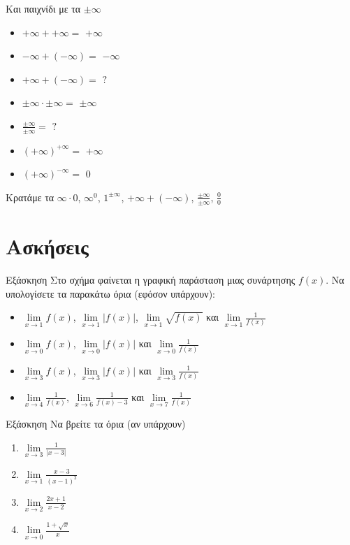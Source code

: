 \documentclass[greek]{beamer}
\begin{document}
\begin{frame}{Και παιχνίδι με τα $\pm\infty$}
 \begin{multicols}{2}
  \begin{itemize}
   \item $+\infty + +\infty=$ \pause $+\infty$ \pause
   \item $-\infty + (-\infty)=$ \pause $-\infty$ \pause
   \item $+\infty + (-\infty)=$ \pause $?$ \pause
   \item $\pm\infty \cdot \pm\infty=$ \pause $\pm\infty$ \pause
   \item $\frac{\pm\infty}{\pm\infty}=$ \pause $?$ \pause
   \item $(+\infty)^{+\infty}=$ \pause $+\infty$ \pause
   \item $(+\infty)^{-\infty}=$ \pause $0$ \pause
  \end{itemize}
 \end{multicols}
 Κρατάμε τα $\infty\cdot 0$, $\infty^0$, $1^{\pm\infty}$, $+\infty + (-\infty)$, $\frac{\pm\infty}{\pm\infty}$, $\frac{0}{0}$
\end{frame}

\section{Ασκήσεις}
\begin{frame}{Εξάσκηση}
 Στο σχήμα
 \href{https://www.geogebra.org/m/xzc6usbm}{}
 φαίνεται η γραφική παράσταση μιας συνάρτησης $f(x)$. Να υπολογίσετε τα παρακάτω όρια (εφόσον υπάρχουν):
 \begin{itemize}
  \item $\lim\limits_{x \to 1}{ f(x) }$, $\lim\limits_{x \to 1}{ |f(x)| }$, $\lim\limits_{x \to 1}{ \sqrt{f(x)} }$ και $\lim\limits_{x \to 1}{ \frac{1}{f(x)} }$ \pause
  \item $\lim\limits_{x \to 0}{ f(x) }$, $\lim\limits_{x \to 0}{ |f(x)| }$ και $\lim\limits_{x \to 0}{ \frac{1}{f(x)} }$ \pause
  \item $\lim\limits_{x \to 3}{ f(x) }$, $\lim\limits_{x \to 3}{ |f(x)| }$ και $\lim\limits_{x \to 3}{ \frac{1}{f(x)} }$ \pause
  \item $\lim\limits_{x \to 4}{ \frac{1}{f(x)} }$, $\lim\limits_{x \to 6}{ \frac{1}{f(x)-3} }$ και $\lim\limits_{x \to 7}{ \frac{1}{f(x)} }$
 \end{itemize}
\end{frame}

\begin{frame}{Εξάσκηση}
 Να βρείτε τα όρια (αν υπάρχουν)
 \begin{enumerate}
  \item $\lim\limits_{x \to 3}{ \frac{1}{|x-3|} }$ \pause
  \item $\lim\limits_{x \to 1}{ \frac{x-3}{(x-1)^2} }$ \pause
  \item $\lim\limits_{x \to 2}{ \frac{2x+1}{x-2} }$ \pause
  \item $\lim\limits_{x \to 0}{ \frac{1+\sqrt{x}}{x}}$
 \end{enumerate}
\end{frame}
\end{document}
